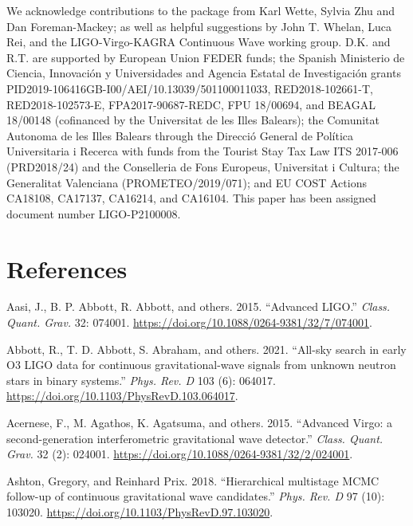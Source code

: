 \documentclass[10pt,a4paper,onecolumn]{article}
\let\textttOrig=\texttt
\def\texttt#1{\expandafter\textttOrig{\seqsplit{#1}}}
\let\addcontentslineOrig=\addcontentsline
\def\addcontentsline#1#2#3{\bgroup
  \let\texttt=\textttOrig\addcontentslineOrig{#1}{#2}{#3}\egroup}
\begin{document}
We acknowledge contributions to the package from Karl Wette, Sylvia Zhu
and Dan Foreman-Mackey; as well as helpful suggestions by John T.
Whelan, Luca Rei, and the LIGO-Virgo-KAGRA Continuous Wave working
group. D.K. and R.T. are supported by European Union FEDER funds; the
Spanish Ministerio de Ciencia, Innovación y Universidades and Agencia
Estatal de Investigación grants
PID2019-106416GB-I00/AEI/10.13039/501100011033, RED2018-102661-T,
RED2018-102573-E, FPA2017-90687-REDC, FPU 18/00694, and BEAGAL 18/00148
(cofinanced by the Universitat de les Illes Balears); the Comunitat
Autonoma de les Illes Balears through the Direcció General de Política
Universitaria i Recerca with funds from the Tourist Stay Tax Law ITS
2017-006 (PRD2018/24) and the Conselleria de Fons Europeus, Universitat
i Cultura; the Generalitat Valenciana (PROMETEO/2019/071); and EU COST
Actions CA18108, CA17137, CA16214, and CA16104. This paper has been
assigned document number LIGO-P2100008.

\hypertarget{references}{%
\section*{References}\label{references}}

\hypertarget{refs}{}
\leavevmode\hypertarget{ref-TheLIGOScientific:2014jea}{}%
Aasi, J., B. P. Abbott, R. Abbott, and others. 2015. ``Advanced LIGO.''
\emph{Class. Quant. Grav.} 32: 074001.
\url{https://doi.org/10.1088/0264-9381/32/7/074001}.

\leavevmode\hypertarget{ref-Abbott:2020mev}{}%
Abbott, R., T. D. Abbott, S. Abraham, and others. 2021. ``All-sky search
in early O3 LIGO data for continuous gravitational-wave signals from
unknown neutron stars in binary systems.'' \emph{Phys. Rev. D} 103 (6):
064017. \url{https://doi.org/10.1103/PhysRevD.103.064017}.

\leavevmode\hypertarget{ref-TheVirgo:2014hva}{}%
Acernese, F., M. Agathos, K. Agatsuma, and others. 2015. ``Advanced
Virgo: a second-generation interferometric gravitational wave
detector.'' \emph{Class. Quant. Grav.} 32 (2): 024001.
\url{https://doi.org/10.1088/0264-9381/32/2/024001}.

\leavevmode\hypertarget{ref-Ashton:2018ure}{}%
Ashton, Gregory, and Reinhard Prix. 2018. ``Hierarchical multistage MCMC
follow-up of continuous gravitational wave candidates.'' \emph{Phys.
Rev. D} 97 (10): 103020.
\url{https://doi.org/10.1103/PhysRevD.97.103020}.
\end{document}

